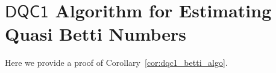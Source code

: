 \documentclass[11pt]{article}
\numberwithin{equation}{section}
\newcommand{\DQC}{\mathsf{DQC1}}
\renewcommand\( {\left(}
\renewcommand\) {\right)}
\begin{document}
    
    







\section{$\DQC$ Algorithm for Estimating Quasi Betti Numbers}\label{app:proof_of_dqc1_algo}
Here we provide a proof of Corollary~\ref{cor:dqc1_betti_algo}.
\end{document}
